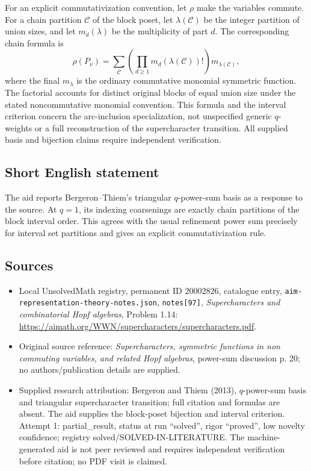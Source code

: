 \documentclass[11pt]{article}
\begin{document}
For an explicit commutativization convention, let \(\rho\) make the variables commute. For a chain partition \(\mathcal C\) of the block poset, let \(\lambda(\mathcal C)\) be the integer partition of union sizes, and let \(m_d(\lambda)\) be the multiplicity of part \(d\). The corresponding chain formula is
\[
 \rho(P_\nu)=\sum_{\mathcal C}
 \left(\prod_{d\geq1}m_d(\lambda(\mathcal C))!\right)
 m_{\lambda(\mathcal C)},
\]
where the final \(m_\lambda\) is the ordinary commutative monomial symmetric function. The factorial accounts for distinct original blocks of equal union size under the stated noncommutative monomial convention. This formula and the interval criterion concern the arc-inclusion specialization, not unspecified generic \(q\)-weights or a full reconstruction of the supercharacter transition. All supplied basis and bijection claims require independent verification.
\subsection{Short English statement}
The aid reports Bergeron--Thiem's triangular \(q\)-power-sum basis as a response to the source. At \(q=1\), its indexing coarsenings are exactly chain partitions of the block interval order. This agrees with the usual refinement power sum precisely for interval set partitions and gives an explicit commutativization rule.
\subsection{Sources}
\begin{itemize}
\item Local UnsolvedMath registry, permanent ID \(20002826\), catalogue entry, \texttt{aim-representation-theory-notes.json}, \texttt{notes[97]}, \emph{Supercharacters and combinatorial Hopf algebras}, Problem 1.14: \url{https://aimath.org/WWN/supercharacters/supercharacters.pdf}.
\item Original source reference: \emph{Supercharacters, symmetric functions in non commuting variables, and related Hopf algebras}, power-sum discussion p. 20; no authors/publication details are supplied.
\item Supplied research attribution: Bergeron and Thiem (2013), \(q\)-power-sum basis and triangular supercharacter transition; full citation and formulas are absent. The aid supplies the block-poset bijection and interval criterion. Attempt 1: partial\_result, status at run ``solved'', rigor ``proved'', low novelty confidence; registry solved/SOLVED-IN-LITERATURE. The machine-generated aid is not peer reviewed and requires independent verification before citation; no PDF visit is claimed.
\end{itemize}
\end{document}
